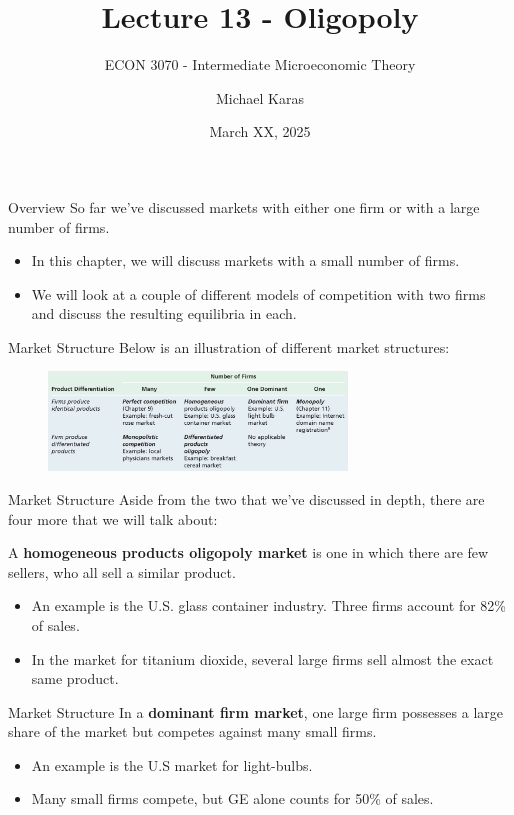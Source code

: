 \documentclass[11pt,t]{beamer}
\author{Michael Karas}
\title{Lecture 13 - Oligopoly}
\subtitle{ECON 3070 - Intermediate Microeconomic Theory}
\date{March XX, 2025}
\begin{document}
\begin{frame}
  \titlepage
\end{frame}

\begin{frame}{Overview}
  So far we've discussed markets with either one firm or with a large number of firms.

  \begin{itemize}
    \item In this chapter, we will discuss markets with a small number of firms.
    
    \item We will look at a couple of different models of competition with two firms and discuss the resulting equilibria in each.
  \end{itemize}
\end{frame}

\begin{frame}{Market Structure}
  Below is an illustration of different market structures:

  \begin{figure}
    \includegraphics[width=300px]{figures/table13_1.jpg}
  \end{figure}
\end{frame}

\begin{frame}{Market Structure}
  Aside from the two that we've discussed in depth, there are four more that we will talk about:

  \bigskip
   A \textbf{homogeneous products oligopoly market} is one in which there are few sellers, who all sell a similar product.
  \begin{itemize}
    \item An example is the U.S. glass container industry. Three firms account for 82\% of sales.
    \item In the market for titanium dioxide, several large firms sell almost the exact same product.
  \end{itemize}
\end{frame}

\begin{frame}{Market Structure}
   In a \textbf{dominant firm market}, one large firm possesses a large share of the market but competes against many small firms.

  \begin{itemize}
    \item An example is the U.S market for light-bulbs.
    \item Many small firms compete, but GE alone counts for 50\% of sales.
  \end{itemize}
\end{frame}
\end{document}
